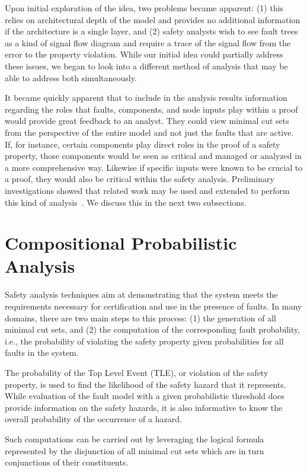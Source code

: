 Upon initial exploration of the idea, two problems became apparent: (1) this relies on architectural depth of the model and provides no additional information if the architecture is a single layer, and (2) safety analysts wish to see fault trees as a kind of signal flow diagram and require a trace of the signal flow from the error to the property violation. While our initial idea could partially address these issues, we began to look into a different method of analysis that may be able to address both simultaneously. 

It became quickly apparent that to include in the analysis results information regarding the roles that faults, components, and node inputs play within a proof would provide great feedback to an analyst. They could view minimal cut sets from the perspective of the entire model and not just the faults that are active. If, for instance, certain components play direct roles in the proof of a safety property, those components would be seen as critical and managed or analyzed in a more comprehensive way. Likewise if specific inputs were known to be crucial to a proof, they would also be critical within the safety analysis. Preliminary investigations showed that related work may be used and extended to perform this kind of analysis~\cite{9081652}. We discuss this in the next two subsections.





\section{Compositional Probabilistic Analysis}
Safety analysis techniques aim at demonstrating that the system meets the requirements necessary for certification and use in the presence of faults. In many domains, there are two main steps to this process: (1) the generation of all minimal cut sets, and (2) the computation of the corresponding fault probability, i.e., the probability of violating the safety property given probabilities for all faults in the system. 

The probability of the Top Level Event (TLE), or violation of the safety property, is used to find the likelihood of the safety hazard that it represents. While evaluation of the fault model with a given probabilistic threshold does provide information on the safety hazards, it is also informative to know the overall probability of the occurrence of a hazard. 

Such computations can be carried out by leveraging the logical formula represented by the disjunction of all minimal cut sets which are in turn conjunctions of their constituents. 

